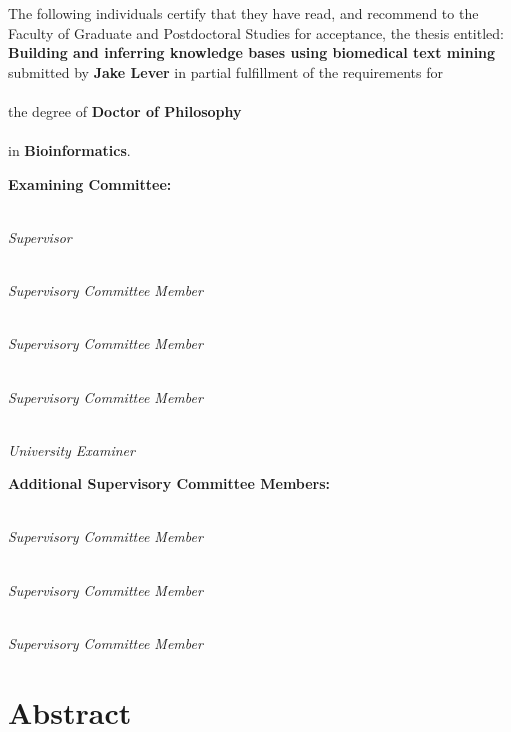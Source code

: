 
\frontmatter

\frontmatter

\setcounter{page}{2}
\noindent The following individuals certify that they have read,
and recommend to the Faculty of Graduate and Postdoctoral Studies
for acceptance, the thesis entitled:\\[1em]
{\large \textbf{Building and inferring knowledge bases using biomedical text mining}}\\[1em]
submitted by \textbf{Jake Lever} in partial fulfillment of the requirements for\\\\
the degree of \textbf{Doctor of Philosophy}\\\\
in \textbf{Bioinformatics}.%
\par\bigskip%
\noindent\textbf{Examining Committee:}%
\par\medskip{}\\\emph{Supervisor}
\par\medskip{}\\\emph{Supervisory Committee Member}
\par\medskip{}\\\emph{Supervisory Committee Member}
\par\medskip{}\\\emph{Supervisory Committee Member}
\par\medskip{}\\\emph{University Examiner}
\par\bigskip%
\noindent\textbf{Additional Supervisory Committee Members:}%
\par\medskip{}\\\emph{Supervisory Committee Member}
\par\medskip{}\\\emph{Supervisory Committee Member}
\par\medskip{}\\\emph{Supervisory Committee Member}
\cleardoublepage

\chapter{Abstract}

